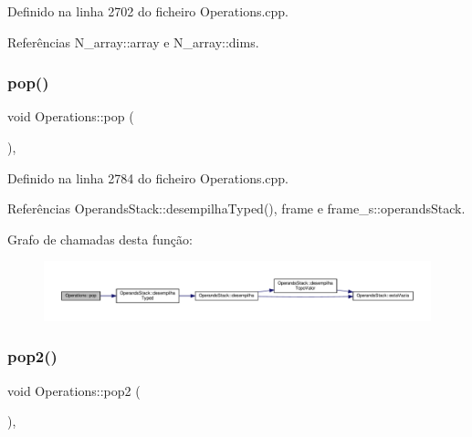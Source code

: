 Definido na linha 2702 do ficheiro Operations.\+cpp.



Referências N\+\_\+array\+::array e N\+\_\+array\+::dims.

\mbox{\label{classOperations_a30b8a646cbfac3712f4b339364bd31b1}} 
\subsubsection{\texorpdfstring{pop()}{pop()}}
{\footnotesize\ttfamily void Operations\+::pop (\begin{DoxyParamCaption}{ }\end{DoxyParamCaption})\hspace{0.3cm}{\ttfamily [static]}, {\ttfamily [private]}}



Definido na linha 2784 do ficheiro Operations.\+cpp.



Referências Operands\+Stack\+::desempilha\+Typed(), frame e frame\+\_\+s\+::operands\+Stack.

Grafo de chamadas desta função\+:
\nopagebreak
\begin{figure}[H]
\begin{center}
\leavevmode
\includegraphics[width=350pt]{classOperations_a30b8a646cbfac3712f4b339364bd31b1_cgraph}
\end{center}
\end{figure}
\mbox{\label{classOperations_a54e578f7f27df39f8c516ec93195e219}} 
\subsubsection{\texorpdfstring{pop2()}{pop2()}}
{\footnotesize\ttfamily void Operations\+::pop2 (\begin{DoxyParamCaption}{ }\end{DoxyParamCaption})\hspace{0.3cm}{\ttfamily [static]}, {\ttfamily [private]}}




